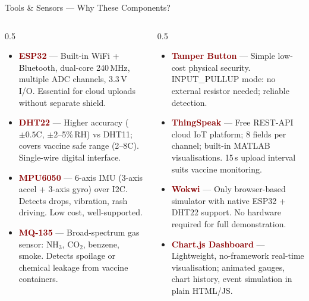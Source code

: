 \documentclass[aspectratio=169, 10pt]{beamer}
\begin{document}
\begin{frame}[shrink=5]{Tools \& Sensors --- Why These Components?}
  \begin{columns}[T]
    \begin{column}{0.5\textwidth}
      \begin{itemize}\setlength\itemsep{0.3em}
        \item \textbf{\textcolor{darkred}{ESP32}} --- Built-in WiFi + Bluetooth, dual-core 240\,MHz, multiple ADC channels, 3.3\,V I/O. Essential for cloud uploads without separate shield.

        \item \textbf{\textcolor{darkred}{DHT22}} --- Higher accuracy ($\pm0.5$\textdegree C, $\pm2$--5\%\,RH) vs DHT11; covers vaccine safe range (2--8\textdegree C). Single-wire digital interface.

        \item \textbf{\textcolor{darkred}{MPU6050}} --- 6-axis IMU (3-axis accel + 3-axis gyro) over I2C. Detects drops, vibration, rash driving. Low cost, well-supported.

        \item \textbf{\textcolor{darkred}{MQ-135}} --- Broad-spectrum gas sensor: $\text{NH}_3$, $\text{CO}_2$, benzene, smoke. Detects spoilage or chemical leakage from vaccine containers.
      \end{itemize}
    \end{column}
    \begin{column}{0.5\textwidth}
      \begin{itemize}\setlength\itemsep{0.3em}
        \item \textbf{\textcolor{darkred}{Tamper Button}} --- Simple low-cost physical security. INPUT\_PULLUP mode: no external resistor needed; reliable detection.

        \item \textbf{\textcolor{darkred}{ThingSpeak}} --- Free REST-API cloud IoT platform; 8 fields per channel; built-in MATLAB visualisations. 15\,s upload interval suits vaccine monitoring.

        \item \textbf{\textcolor{darkred}{Wokwi}} --- Only browser-based simulator with native ESP32 + DHT22 support. No hardware required for full demonstration.

        \item \textbf{\textcolor{darkred}{Chart.js Dashboard}} --- Lightweight, no-framework real-time visualisation; animated gauges, chart history, event simulation in plain HTML/JS.
      \end{itemize}
    \end{column}
  \end{columns}
\end{frame}
\end{document}

